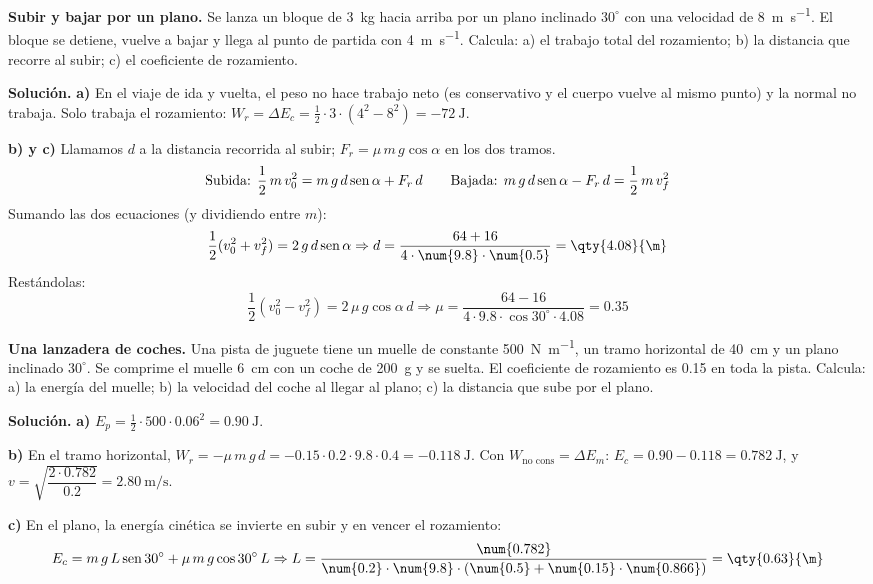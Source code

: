 \begin{example}
    \textbf{Subir y bajar por un plano.} Se lanza un bloque de \qty{3}{\kg} hacia arriba por un plano inclinado \(30^\circ\) con una
    velocidad de \qty{8}{\m\per\s}. El bloque se detiene, vuelve a bajar y llega al punto de partida con \qty{4}{\m\per\s}. Calcula: a) el
    trabajo total del rozamiento; b) la distancia que recorre al subir; c) el coeficiente de rozamiento.

    \textbf{Solución.} \textbf{a)} En el viaje de ida y vuelta, el peso no hace trabajo neto (es conservativo y el cuerpo vuelve al
    mismo punto) y la normal no trabaja. Solo trabaja el rozamiento:
    \(W_r = \Delta E_c = \frac{1}{2} \cdot 3 \cdot (4^2 - 8^2) = \qty{-72}{\joule}\).

    \textbf{b) y c)} Llamamos \(d\) a la distancia recorrida al subir; \(F_r = \mu\,m\,g\cos\alpha\) en los dos tramos.
    \[ \text{Subida: } \frac{1}{2}\,m\,v_0^2 = m\,g\,d\operatorname{sen}\alpha + F_r\,d \qquad \text{Bajada: } m\,g\,d\operatorname{sen}\alpha - F_r\,d = \frac{1}{2}\,m\,v_f^2 \]
    Sumando las dos ecuaciones (y dividiendo entre \(m\)):
    \[ \frac{1}{2}(v_0^2 + v_f^2) = 2\,g\,d\sen\alpha \Rightarrow d = \frac{64 + 16}{4 \cdot \num{9.8} \cdot \num{0.5}} = \qty{4.08}{\m} \]
    Restándolas:
    \[ \frac{1}{2}(v_0^2 - v_f^2) = 2\,\mu\,g\cos\alpha\,d \Rightarrow \mu = \frac{64 - 16}{4 \cdot \num{9.8} \cdot \cos 30^\circ \cdot \num{4.08}} = \num{0.35} \]
\end{example}

\begin{example}
    \textbf{Una lanzadera de coches.} Una pista de juguete tiene un muelle de constante \qty{500}{\newton\per\m}, un tramo horizontal de
    \qty{40}{\cm} y un plano inclinado \(30^\circ\). Se comprime el muelle \qty{6}{\cm} con un coche de \qty{200}{\g} y se suelta. El
    coeficiente de rozamiento es \num{0.15} en toda la pista. Calcula: a) la energía del muelle; b) la velocidad del coche al llegar al
    plano; c) la distancia que sube por el plano.

    \textbf{Solución.} \textbf{a)} \(E_p = \frac{1}{2} \cdot 500 \cdot \num{0.06}^2 = \qty{0.90}{\joule}\).

    \textbf{b)} En el tramo horizontal, \(W_r = -\mu\,m\,g\,d = -\num{0.15} \cdot \num{0.2} \cdot \num{9.8} \cdot \num{0.4} = \qty{-0.118}{\joule}\).
    Con \(W_{\text{no cons}} = \Delta E_m\): \(E_c = \num{0.90} - \num{0.118} = \qty{0.782}{\joule}\), y \(v = \sqrt{\dfrac{2 \cdot \num{0.782}}{\num{0.2}}} = \qty{2.80}{\m\per\s}\).

    \textbf{c)} En el plano, la energía cinética se invierte en subir y en vencer el rozamiento:
    \[ E_c = m\,g\,L\sen 30^\circ + \mu\,m\,g\cos 30^\circ\,L \Rightarrow L = \frac{\num{0.782}}{\num{0.2} \cdot \num{9.8} \cdot (\num{0.5} + \num{0.15} \cdot \num{0.866})}
    = \qty{0.63}{\m} \]
\end{example}

